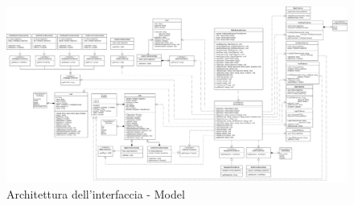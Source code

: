 \begin{landscape}
	\begin{figure}[h!]
		\includegraphics[width=24cm]{img/ui_messaggi.png}
		\caption{Architettura dell'interfaccia - Model}
	\end{figure}
\end{landscape}
